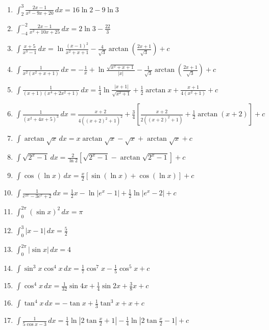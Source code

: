 \documentclass[11pt,a4paper]{article}
\begin{document}
\begin{enumerate}
\item $\displaystyle \int_{2}^{3} \frac{2x - 1}{x^{2} - 9x + 20} \, dx = 16\ln 2 - 9\ln 3$
\item $\displaystyle \int_{-4}^{-2} \frac{2x - 1}{x^{2} + 10x + 25} \, dx = 2\ln 3 - \frac{22}{3}$
\item $\displaystyle \int \frac{x + 5}{x^{3} - 1} \, dx = \ln\frac{(x - 1)^{2}}{x^{2} + x + 1} - \frac{4}{\sqrt{3}}\arctan\left(\frac{2x + 1}{\sqrt{3}}\right) + c$
\item $\displaystyle \int \frac{1}{x^{2}\left(x^{2} + x + 1\right)} \, dx = -\frac{1}{x} + \ln\frac{\sqrt{x^{2} + x + 1}}{|x|} - \frac{1}{\sqrt{3}}\arctan\left(\frac{2x + 1}{\sqrt{3}}\right) + c$
\item $\displaystyle \int \frac{1}{(x + 1)\left(x^{4} + 2x^{2} + 1\right)} \, dx = \frac{1}{4}\ln\frac{|x + 1|}{\sqrt{x^{2} + 1}} + \frac{1}{2}\arctan x + \frac{x + 1}{4\left(x^{2} + 1\right)} + c$
\item $\displaystyle \int \frac{1}{\left(x^{2} + 4x + 5\right)^{3}} \, dx = \frac{x + 2}{4\left((x + 2)^{2} + 1\right)^{2}} + \frac{3}{4}\left[\frac{x + 2}{2\left((x + 2)^{2} + 1\right)} + \frac{1}{2}\arctan(x + 2)\right] + c$
\item $\displaystyle \int \arctan\sqrt{x} \, dx = x\arctan\sqrt{x} - \sqrt{x} + \arctan\sqrt{x} + c$
\item $\displaystyle \int \sqrt{2^{x} - 1} \, dx = \frac{2}{\ln 2}\left[\sqrt{2^{x} - 1} - \arctan\sqrt{2^{x} - 1}\right] + c$
\item $\displaystyle \int \cos(\ln x) \, dx = \frac{x}{2}\left[\sin(\ln x) + \cos(\ln x)\right] + c$
\item $\displaystyle \int \frac{1}{e^{2x} - 3e^{x} + 2} \, dx = \frac{1}{2}x - \ln|e^{x} - 1| + \frac{1}{2}\ln|e^{x} - 2| + c$
\item $\displaystyle \int_{0}^{2\pi} (\sin x)^{2} \, dx = \pi$
\item $\displaystyle \int_{0}^{3} |x - 1| \, dx = \frac{5}{2}$
\item $\displaystyle \int_{0}^{2\pi} |\sin x| \, dx = 4$
\item $\displaystyle \int \sin^{3} x \cos^{4} x \, dx = \frac{1}{7}\cos^{7} x - \frac{1}{5}\cos^{5} x + c$
\item $\displaystyle \int \cos^{4} x \, dx = \frac{1}{32}\sin 4x + \frac{1}{4}\sin 2x + \frac{3}{8}x + c$
\item $\displaystyle \int \tan^{4} x \, dx = -\tan x + \frac{1}{3}\tan^{3} x + x + c$
\item $\displaystyle \int \frac{1}{5\cos x - 3} \, dx = \frac{1}{4}\ln\left|2\tan\frac{x}{2} + 1\right| - \frac{1}{4}\ln\left|2\tan\frac{x}{2} - 1\right| + c$

\end{enumerate}
\end{document}
